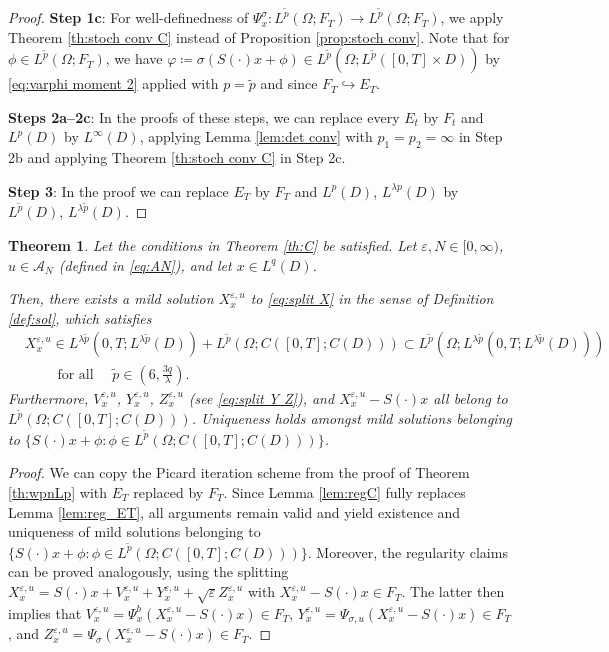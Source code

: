 \documentclass[10pt,a4paper]{amsart}
\newtheorem{theorem}{Theorem}[section]
\numberwithin{equation}{section}
\newcommand{\ceqq}{\coloneqq}
\newcommand{\col}{\colon}
\newcommand{\eps}{\varepsilon}
\newcommand{\Om}{\Omega}
\newcommand{\A}{{\mathcal A}}
\newcommand{\into}{\hookrightarrow}
\begin{document}
\begin{proof}
\textbf{Step 1c}: 
For well-definedness of $\Psi_x^{\sigma}\col L^{\tilde p}(\Om;F_T)\to L^{\tilde p}(\Om;F_T)$, we apply Theorem \ref{th:stoch conv C} instead of Proposition \ref{prop:stoch conv}.  Note that for $\phi\in L^{\tilde p}(\Om;F_T)$, we have $\varphi\ceqq \sigma(S(\cdot)x+\phi)\in L^{\tilde p}(\Om;L^{\tilde p}([0,T]\times D))$ by \eqref{eq:varphi moment 2} applied with $p=\tilde p$ and since $F_T\into E_T$. 

\textbf{Steps 2a--2c}: In the proofs of these steps, we can replace every $E_t$ by $F_t$ and $L^p(D)$ by $L^\infty(D)$, applying Lemma \ref{lem:det conv}   with $p_1=p_2=\infty$ in Step 2b and applying  Theorem \ref{th:stoch conv C} in Step 2c. 
 
\textbf{Step 3}: In the proof we can replace $E_T$ by $F_T$ and $L^p(D)$, $L^{\lambda p}(D)$ by $L^{\tilde p}(D)$, $L^{\lambda\tilde p}(D)$.  
\end{proof}


\begin{theorem}\label{th:wpnC}
Let the conditions in Theorem \ref{th:C} be satisfied. Let $\eps,N\in[0,\infty)$, $u\in \A_N$ (defined in \eqref{eq:AN}), and let  $x\in L^q(D)$. 

Then, there exists a mild solution $X_x^{\eps,u}$ to \eqref{eq:split X} in the sense of Definition \ref{def:sol}, which  satisfies 
\begin{align*}
&X_x^{\eps,u}\in L^{\lambda \tilde p}(0,T;L^{\lambda \tilde p}(D))+ L^{\tilde{p}}(\Omega;C([0,T];C(D)))\subset L^{\tilde p}(\Om;L^{\lambda \tilde p}(0,T;L^{\lambda \tilde p}(D)))\\
&\qquad\text{ for all }\quad \tilde{p}\in (6,\frac{3q}{\lambda}). 
\end{align*}
 Furthermore, $V^{\eps,u}_x$, $Y^{\eps,u}_x$, $Z^{\eps,u}_x$ (see  \eqref{eq:split Y Z}), and $X^{\eps,u}_x -S(\cdot)x$   all belong to  $L^{\tilde{p}}(\Omega;C([0,T];C(D)))$.  
 Uniqueness holds amongst mild solutions belonging to $\{S(\cdot)x+\phi:\phi\in L^{\tilde p}(\Om;C([0,T];C(D)))\}$. 
\end{theorem} 
\begin{proof}
We can copy the Picard iteration scheme from the proof of Theorem \ref{th:wpnLp} with $E_T$ replaced by $F_T$. Since Lemma \ref{lem:regC} fully replaces Lemma  \ref{lem:reg_ET}, all arguments remain valid and yield existence and uniqueness of mild solutions belonging to $\{S(\cdot)x+\phi:\phi\in L^{\tilde p}(\Om;C([0,T];C(D)))\}$. Moreover, the regularity claims can be proved analogously, using the splitting    
$X_x^{\eps,u}=S(\cdot)x+V_x^{\eps,u}+Y_x^{\eps,u}+\sqrt{\eps}Z_x^{\eps,u}$ with $X_x^{\eps,u}-S(\cdot)x\in F_T$. The latter then implies that $V_x^{\eps,u}=\Psi_x^b(X_x^{\eps,u}-S(\cdot)x)\in F_T$, $Y_x^{\eps,u}=\Psi_{\sigma,u}(X_x^{\eps,u}-S(\cdot)x)\in F_T$, and $Z_x^{\eps,u}=\Psi_{\sigma}(X_x^{\eps,u}-S(\cdot)x)\in  F_T$. 
\end{proof}
\end{document}
